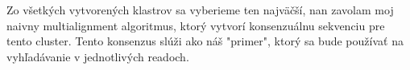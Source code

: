 Zo všetkých vytvorených klastrov sa vyberieme ten najväčší, nan zavolam moj naivny multialignment algoritmus, ktorý vytvorí konsenzuálnu sekvenciu pre tento cluster. Tento konsenzus slúži ako náš "primer", ktorý sa bude používať na vyhľadávanie v jednotlivých readoch.
